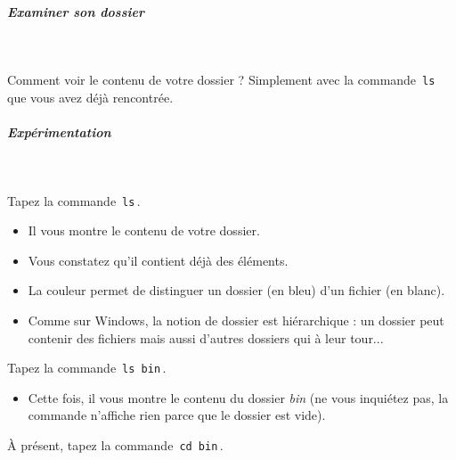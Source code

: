 \documentclass[11pt,a4paper]{article}
\begin{document}
			
		\subparagraph{Examiner son dossier} 
		
					\textcolor{white}{.} \par
				
            \par
        
					Comment voir le contenu de votre dossier ? Simplement avec la commande
					\,\verb|ls|\, que vous avez d\'ej\`a rencontr\'ee.
				
            \par
        
			
		\subparagraph{Exp\'erimentation} 
		
					\textcolor{white}{.} \par
				
            \par
        
					Tapez la commande \,\verb|ls|\,.
				
            \par
        
					\begin{itemize}
				
			\item Il vous montre le contenu de votre dossier.
			\item Vous constatez qu'il contient d\'ej\`a des \'el\'ements.
			\item La couleur permet de distinguer un dossier (en bleu) d'un fichier (en blanc).
			\item Comme sur Windows, la notion de dossier est hi\'erarchique : un dossier peut contenir des fichiers mais aussi d'autres dossiers qui \`a leur tour...
					\end{itemize}
				
					Tapez la commande \,\verb|ls bin|\,.
				
            \par
        
					\begin{itemize}
				
			\item 
						Cette fois, il vous montre le contenu du dossier
						\textit{bin}
						(ne vous inqui\'etez pas, la commande n'affiche rien parce que le dossier est vide).
					
					\end{itemize}
				
					\`A pr\'esent, tapez la commande \,\verb|cd bin|\,.
				
            \par
        
\end{document}
